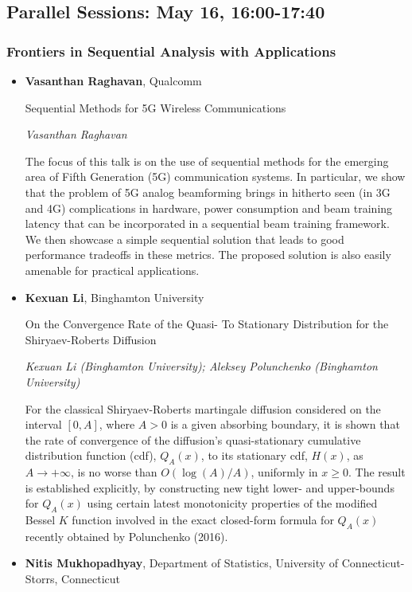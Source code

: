 \subsection*{Parallel Sessions: May 16, 16:00-17:40}

\subsubsection*{Frontiers in Sequential Analysis with Applications}

\begin{itemize}
\item \textbf{Vasanthan Raghavan}, Qualcomm

Sequential Methods for 5G Wireless Communications

\emph{\footnotesize Vasanthan Raghavan}

The focus of this talk is on the use of sequential methods for the emerging area of Fifth Generation (5G) communication systems. In particular, we show that the problem of 5G analog beamforming brings in hitherto seen (in 3G and 4G) complications in hardware, power consumption and beam training latency that can be incorporated in a sequential beam training framework. We then showcase a simple sequential solution that leads to good performance tradeoffs in these metrics. The proposed solution is also easily amenable for practical applications.

\item \textbf{Kexuan Li}, Binghamton University

On the Convergence Rate of the Quasi- To Stationary Distribution for the Shiryaev-Roberts Diffusion

\emph{\footnotesize Kexuan Li (Binghamton University); Aleksey Polunchenko (Binghamton University)}

For the classical Shiryaev-Roberts martingale diffusion considered on the interval $[0,A]$, where $A>0$ is a given absorbing boundary, it is shown that the rate of convergence of the diffusion's quasi-stationary cumulative distribution function (cdf), $Q_{A}(x)$, to its stationary cdf, $H(x)$, as $A\to+\infty$, is no worse than $O(\log(A)/A)$, uniformly in $x\ge0$. The result is established explicitly, by constructing new tight lower- and upper-bounds for $Q_{A}(x)$ using certain latest monotonicity properties of the modified Bessel $K$ function involved in the exact closed-form formula for $Q_{A}(x)$ recently obtained by Polunchenko (2016).

\item \textbf{Nitis Mukhopadhyay}, Department of Statistics, University of Connecticut-Storrs, Connecticut


\end{itemize}
